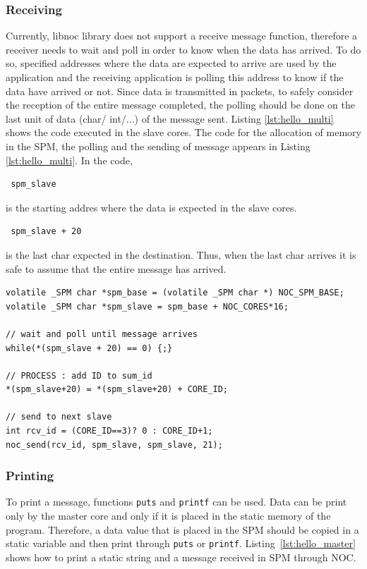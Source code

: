 \documentclass[a4paper,fontsize=10pt,twoside,DIV15,BCOR12mm,headinclude=true,footinclude=false,pagesize,bibtotoc]{scrbook}
\newcommand{\code}[1]{{\texttt{#1}}}
\begin{document}
\subsubsection{Receiving}
Currently, libnoc library does not support a receive message function,
therefore a receiver needs to wait and poll in order to know when the data has arrived.
To do so, specified addresses where the data are expected to arrive are used by the
application and the receiving application is polling this address to
know if the data have arrived or not. 
Since data is transmitted in packets, to safely consider the reception of the entire message
completed, the polling should be done on the last unit of data (char/ int/...) of the message sent.
Listing \ref{lst:hello_multi} shows the code executed in the slave cores.
The code for the allocation of memory in the SPM, the polling and the sending of message 
appears in Listing \ref{lst:hello_multi}. In the code, \begin{verbatim} spm_slave \end{verbatim}
is the starting addres where the data is expected in the slave cores. 
\begin{verbatim} spm_slave + 20 \end{verbatim} is the last char expected in the destination.
Thus, when the last char arrives it is safe to assume that the entire message has arrived.


\begin{lstlisting}[float,caption={A 2x2 Hello World application: Slave.\label{lst:hello_multi}}]
volatile _SPM char *spm_base = (volatile _SPM char *) NOC_SPM_BASE;
volatile _SPM char *spm_slave = spm_base + NOC_CORES*16;

// wait and poll until message arrives
while(*(spm_slave + 20) == 0) {;}

// PROCESS : add ID to sum_id
*(spm_slave+20) = *(spm_slave+20) + CORE_ID;

// send to next slave
int rcv_id = (CORE_ID==3)? 0 : CORE_ID+1;
noc_send(rcv_id, spm_slave, spm_slave, 21);

\end{lstlisting}

\subsubsection{Printing}
To print a message, functions \code{puts} and \code{printf} can be used. Data can be print only
by the master core and only if it is placed in the static memory of the program. Therefore,
a data value that is placed in the SPM should be copied in a static variable 
and then print through \code{puts} or \code{printf}. Listing~\ref{lst:hello_master}
shows how to print a static string and a message received in SPM through NOC.
\end{document}
